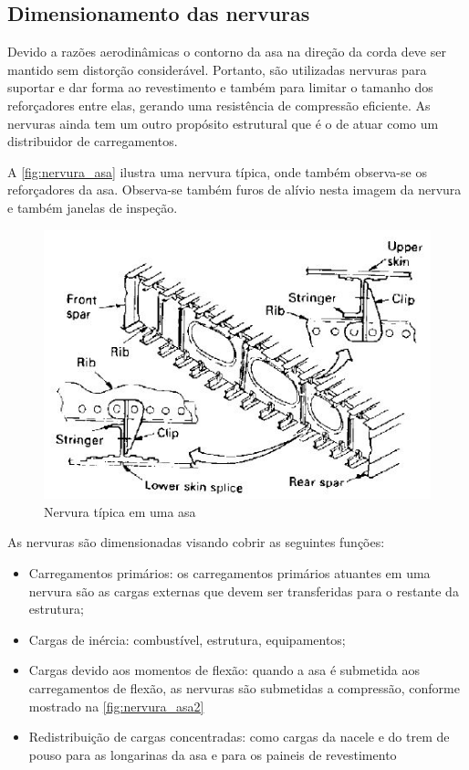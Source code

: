 \subsection{Dimensionamento das nervuras}
Devido a razões aerodinâmicas o contorno da asa na direção da corda deve ser mantido sem distorção considerável. Portanto, são utilizadas nervuras para suportar e dar forma ao revestimento e também para limitar o tamanho dos reforçadores entre elas, gerando uma resistência de compressão eficiente. As nervuras ainda tem um outro propósito estrutural que é o de atuar como um distribuidor de carregamentos.

A \autoref{fig:nervura_asa} ilustra uma nervura típica, onde também observa-se os reforçadores da asa. Observa-se também furos de alívio nesta imagem da nervura e também janelas de inspeção.

\begin{figure}
\centering
\includegraphics[width=\textwidth]{images/parte4/nervura}
\caption{Nervura típica em uma asa}
\label{fig:nervura_asa}
\end{figure}

As nervuras são dimensionadas visando cobrir as seguintes funções:
\begin{itemize}
  \item Carregamentos primários: os carregamentos primários atuantes em uma nervura são as cargas externas que devem ser transferidas para o restante da estrutura;
  \item Cargas de inércia: combustível, estrutura, equipamentos;
  \item Cargas devido aos momentos de flexão: quando a asa é submetida aos carregamentos de flexão, as nervuras são submetidas a compressão, conforme mostrado na \autoref{fig:nervura_asa2}
  \item Redistribuição de cargas concentradas: como cargas da nacele e do trem de pouso para as longarinas da asa e para os paineis de revestimento
\end{itemize}

